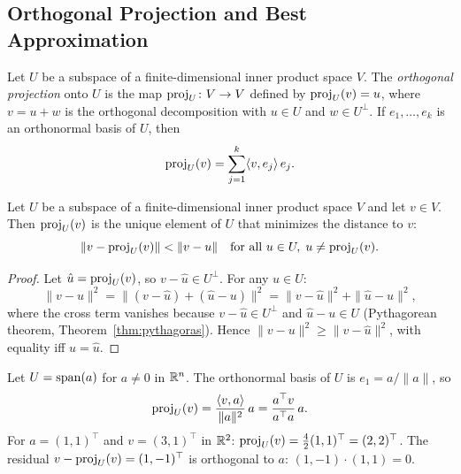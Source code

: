 \documentclass[11pt,a4paper]{article}
\begin{document}
\subsection{Orthogonal Projection and Best Approximation}

\begin{definition}
\label{def:projection}
Let $U$ be a subspace of a finite-dimensional inner product space $V$.
The \emph{orthogonal projection} onto $U$ is the map
$\operatorname{proj}_U\colon V \to V$ defined by $\operatorname{proj}_U(v) = u$, where $v = u + w$
is the orthogonal decomposition with $u \in U$ and $w \in U^\perp$.
If $e_1, \ldots, e_k$ is an orthonormal basis of $U$, then
\[
  \operatorname{proj}_U(v) = \sum_{j=1}^{k} \langle v, e_j \rangle\, e_j.
\]
\end{definition}

\begin{keyresult}[title={Orthogonal Projection and Best Approximation}]
\begin{theorem}
\label{thm:best_approx}
Let $U$ be a subspace of a finite-dimensional inner product space $V$
and let $v \in V$.  Then $\operatorname{proj}_U(v)$ is the unique element of $U$ that
minimizes the distance to $v$:
\[
  \|v - \operatorname{proj}_U(v)\| < \|v - u\| \quad \text{for all } u \in U,
  \; u \neq \operatorname{proj}_U(v).
\]
\end{theorem}
\end{keyresult}

\begin{proof}
Let $\hat{u} = \operatorname{proj}_U(v)$, so $v - \hat{u} \in U^\perp$.  For any
$u \in U$:
\[
  \|v - u\|^2 = \|(v - \hat{u}) + (\hat{u} - u)\|^2
  = \|v - \hat{u}\|^2 + \|\hat{u} - u\|^2,
\]
where the cross term vanishes because $v - \hat{u} \in U^\perp$ and
$\hat{u} - u \in U$ (Pythagorean theorem, Theorem~\ref{thm:pythagoras}).
Hence $\|v - u\|^2 \geq \|v - \hat{u}\|^2$, with equality iff
$u = \hat{u}$.
\end{proof}

\begin{example}
\label{ex:proj_line}
Let $U = \operatorname{span}(a)$ for $a \neq 0$ in $\mathbb{R}^n$.  The orthonormal basis of
$U$ is $e_1 = a/\|a\|$, so
\[
  \operatorname{proj}_U(v) = \frac{\langle v, a \rangle}{\|a\|^2}\, a
  = \frac{a^\top v}{a^\top a}\, a.
\]
For $a = (1,1)^\top$ and $v = (3,1)^\top$ in $\mathbb{R}^2$:
$\operatorname{proj}_U(v) = \frac{4}{2}(1,1)^\top = (2,2)^\top$.
The residual $v - \operatorname{proj}_U(v) = (1,-1)^\top$ is orthogonal to $a$:
$(1,-1) \cdot (1,1) = 0$.
\end{example}
\end{document}

